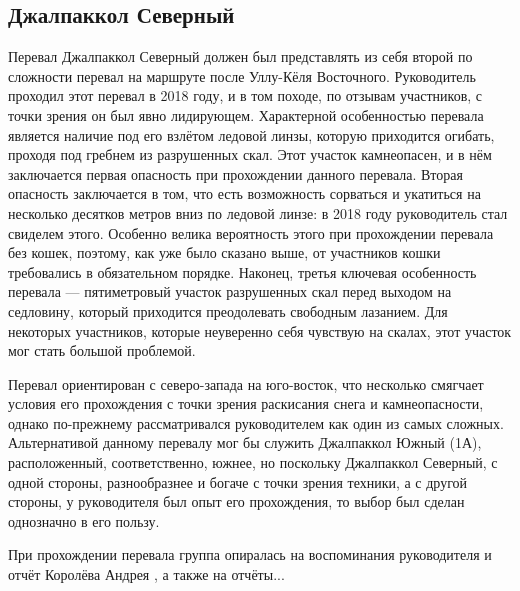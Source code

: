 \subsection{Джалпаккол Северный} 
Перевал Джалпаккол Северный должен был представлять из себя второй по сложности перевал на маршруте после Уллу-Кёля Восточного. Руководитель проходил этот перевал в 2018 году, и в том походе, по отзывам участников, с точки зрения он был явно лидирующем. Характерной особенностью перевала является наличие под его взлётом ледовой линзы, которую приходится огибать, проходя под гребнем из разрушенных скал. Этот участок камнеопасен, и в нём заключается первая опасность при прохождении данного перевала. Вторая опасность заключается в том, что есть возможность сорваться и укатиться на несколько десятков метров вниз по ледовой линзе: в 2018 году руководитель стал свиделем этого. Особенно велика вероятность этого при прохождении перевала без кошек, поэтому, как уже было сказано выше, от участников кошки требовались в обязательном порядке. Наконец, третья ключевая особенность перевала --- пятиметровый участок разрушенных скал перед выходом на седловину, который приходится преодолевать свободным лазанием. Для некоторых участников, которые неуверенно себя чувствую на скалах, этот участок мог стать большой проблемой. 

Перевал ориентирован с северо-запада на юго-восток, что несколько смягчает условия его прохождения с точки зрения раскисания снега и камнеопасности, однако по-прежнему рассматривался руководителем как один из самых сложных. Альтернативой данному перевалу мог бы служить Джалпаккол Южный (1А), расположенный, соответственно, южнее, но поскольку Джалпаккол Северный, с одной стороны, разнообразнее и богаче с точки зрения техники, а с другой стороны, у руководителя был опыт его прохождения, то выбор был сделан однозначно в его пользу. 

При прохождении перевала группа опиралась на воспоминания руководителя и отчёт Королёва Андрея \cite{Korolyov2018}, а также на отчёты...